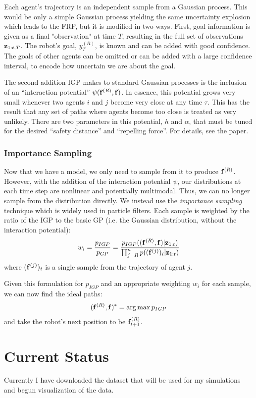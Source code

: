 \documentclass[a4paper,11pt,headings=small]{article}
\DeclareMathOperator*{\argmax}{arg\,max}
\begin{document}
Each agent's trajectory is an independent sample from a Gaussian process. This would be only a simple Gaussian process yielding the same uncertainty explosion which leads to the FRP, but it is modified in two ways. First, goal information is given as a final "observation" at time $T$, resulting in the full set of observations $\mathbf{z}_{1:t,T}$. The robot's goal, $y_T^{(R)}$, is known and can be added with good confidence. The goals of other agents can be omitted or can be added with a large confidence interval, to encode how uncertain we are about the goal.

The second addition IGP makes to standard Gaussian processes is the inclusion of an ``interaction potential'' $\psi(\mathbf{f}^{(R)},\mathbf{f})$. In essence, this potential grows very small whenever two agents $i$ and $j$ become very close at any time $\tau$. This has the result that any set of paths where agents become too close is treated as very unlikely. There are two parameters in this potential, $h$ and $\alpha$, that must be tuned for the desired ``safety distance'' and ``repelling force''. For details, see the paper.

\subsubsection*{Importance Sampling}
Now that we have a model, we only need to sample from it to produce $\mathbf{f}^{(R)}$. However, with the addition of the interaction potential $\psi$, our distributions at each time step are nonlinear and potentially multimodal. Thus, we can no longer sample from the distribution directly. We instead use the \emph{importance sampling} technique which is widely used in particle filters. Each sample is weighted by the ratio of the IGP to the basic GP (i.e. the Gaussian distribution, without the interaction potential):
$$ w_i = \frac{p_{IGP}}{p_{GP}} = \frac{p_{IGP}((\mathbf{f}^{(R)},\mathbf{f}) | \mathbf{z}_{1:t})}{\prod_{j=R}^n p((\mathbf{f}^{(j)})_i | \mathbf{z}_{1:t})} $$
where $(\mathbf{f}^{(j)})_i$ is a single sample from the trajectory of agent $j$.

Given this formulation for $p_{IGP}$ and an appropriate weighting $w_i$ for each sample, we can now find the ideal paths:
$$ (\fr,\f)^* = \argmax p_{IGP} $$
and take the robot's next position to be $\mathbf{f}^{(R)}_{t+1}$.

\section*{Current Status}
\quad Currently I have downloaded the dataset that will be used for my simulations and begun visualization of the data.
\end{document}
